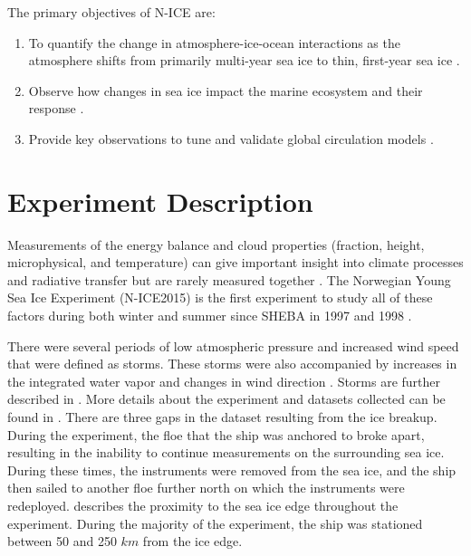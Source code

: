 The primary objectives of N-ICE are:

\begin{enumerate}
    \item To quantify the change in atmosphere-ice-ocean interactions as the atmosphere shifts from primarily multi-year sea ice to thin, first-year sea ice \citep{granskog:2018, granskog:2015}. 
    \item Observe how changes in sea ice impact the marine ecosystem and their response \citep{granskog:2015}.
    \item Provide key observations to tune and validate global circulation models \citep{granskog:2018, granskog:2015}.
\end{enumerate}

\section{Experiment Description}

Measurements of the energy balance and cloud properties (fraction, height, microphysical, and temperature) can give important insight into climate processes and radiative transfer but are rarely measured together \citep{persson:2002, schweiger:2004}. The Norwegian Young Sea Ice Experiment (N-ICE2015) is the first experiment to study all of these factors during both winter and summer since SHEBA in 1997 and 1998 \citep{walden:2017}. 

There were several periods of low atmospheric pressure and increased wind speed that were defined as storms. These storms were also accompanied by increases in the integrated water vapor and changes in wind direction \citep{kayser:2017}. Storms are further described in \citet{cohen:2017, kayser:2017}. More details about the experiment and datasets collected can be found in \citet{granskog:2015}. There are three gaps in the dataset resulting from the ice breakup. During the experiment, the floe that the ship was anchored to broke apart, resulting in the inability to continue measurements on  the surrounding sea ice. During these times, the instruments were removed from the sea ice, and the ship then sailed to another floe further north on which the instruments were redeployed. \citet{itkin:2017} describes the proximity to the sea ice edge throughout the experiment. During the majority of the experiment, the ship was stationed between 50 and 250 $km$ from the ice edge. 

